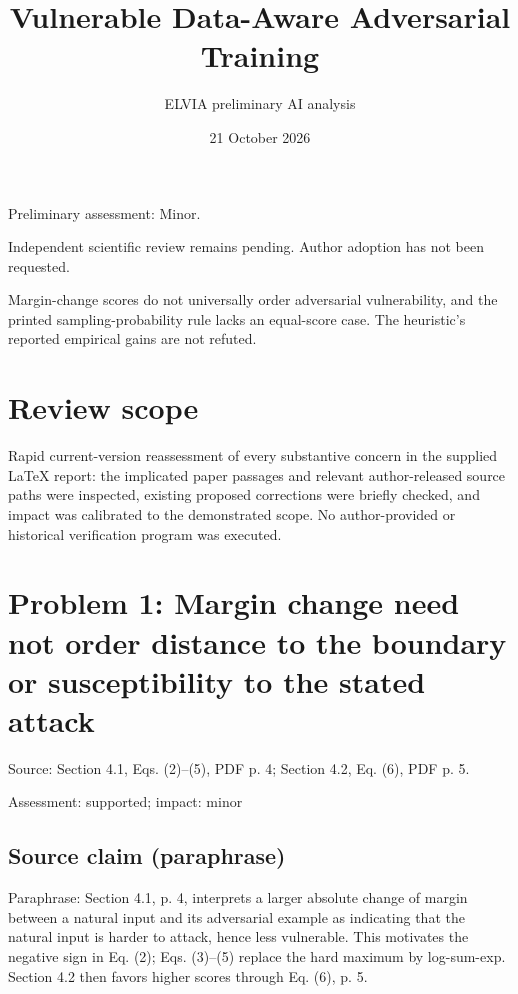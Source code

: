 \documentclass[11pt]{article}
\begin{document}
\title{Vulnerable Data-Aware Adversarial Training}

\author{ELVIA preliminary AI analysis}\date{21 October 2026}\maketitle

Preliminary assessment: Minor.\par

Independent scientific review remains pending. Author adoption has not been requested.

Margin-change scores do not universally order adversarial vulnerability, and the printed sampling-probability rule lacks an equal-score case. The heuristic's reported empirical gains are not refuted.

\section*{Review scope}

Rapid current-version reassessment of every substantive concern in the supplied LaTeX report: the implicated paper passages and relevant author-released source paths were inspected, existing proposed corrections were briefly checked, and impact was calibrated to the demonstrated scope. No author-provided or historical verification program was executed.

\section*{Problem 1: Margin change need not order distance to the boundary or susceptibility to the stated attack}

Source: Section 4.1, Eqs. (2)–(5), PDF p. 4; Section 4.2, Eq. (6), PDF p. 5.

Assessment: supported; impact: minor

\subsection*{Source claim (paraphrase)}

Paraphrase: Section 4.1, p. 4, interprets a larger absolute change of margin between a natural input and its adversarial example as indicating that the natural input is harder to attack, hence less vulnerable. This motivates the negative sign in Eq. (2); Eqs. (3)–(5) replace the hard maximum by log-sum-exp. Section 4.2 then favors higher scores through Eq. (6), p. 5.
\end{document}
